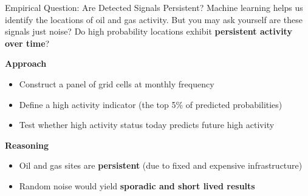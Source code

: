 \documentclass[10pt]{beamer}
\begin{document}
\begin{frame}{Empirical Question: Are Detected Signals Persistent?}
Machine learning helps us identify the locations of oil and gas activity. But you may ask yourself are these signals just noise? Do high probability locations exhibit \textbf{persistent activity over time}?

\vspace{0.8em}

\textbf{Approach}

\vspace{0.4em}

\begin{itemize}
\item Construct a panel of grid cells at monthly frequency
\item Define a high activity indicator (the top 5\% of predicted probabilities)
\item Test whether high activity status today predicts future high activity
\end{itemize}

\vspace{0.8em}

\textbf{Reasoning}

\vspace{0.4em}

\begin{itemize}
\item Oil and gas sites are \textbf{persistent} (due to fixed and expensive infrastructure)
\item Random noise would yield \textbf{sporadic and short lived results}
\end{itemize}
\end{frame}
\end{document}
